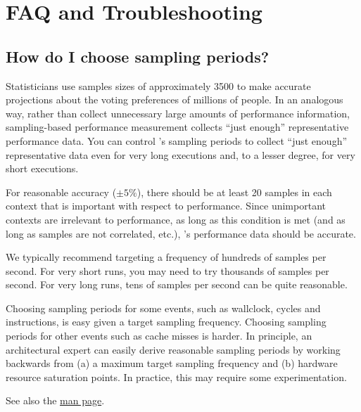 \documentclass[11pt,letterpaper]{report}
\begin{document}
\chapter{FAQ and Troubleshooting}
\label{chpt:faq-troubleshooting}


\section{How do I choose \hpcrun{} sampling periods?}
\label{sec:troubleshooting:hpcrun-sample-periods}

Statisticians use samples sizes of approximately 3500 to make accurate projections about the voting preferences of millions of people.
In an analogous way, rather than collect unnecessary large amounts of performance information, sampling-based performance measurement collects ``just enough'' representative performance data.
You can control \hpcrun{}'s sampling periods to collect ``just enough'' representative data even for very long executions and, to a lesser degree, for very short executions.

For reasonable accuracy ($\pm 5\%$), there should be at least 20 samples in each context that is important with respect to performance.
Since unimportant contexts are irrelevant to performance, as long as this condition is met (and as long as samples are not correlated, etc.), \HPCToolkit{}'s performance data should be accurate.

We typically recommend targeting a frequency of hundreds of samples per second.
For very short runs, you may need to try thousands of samples per second.
For very long runs, tens of samples per second can be quite reasonable.

Choosing sampling periods for some events, such as wallclock, cycles and instructions, is easy given a target sampling frequency.
Choosing sampling periods for other events such as cache misses is harder.
In principle, an architectural expert can easily derive reasonable sampling periods by working backwards from (a) a maximum target sampling frequency and (b) hardware resource saturation points.
In practice, this may require some experimentation.

See also the \hpcrun{} \href{http://hpctoolkit.org/man/hpcrun.html}{man page}.


\end{document}

